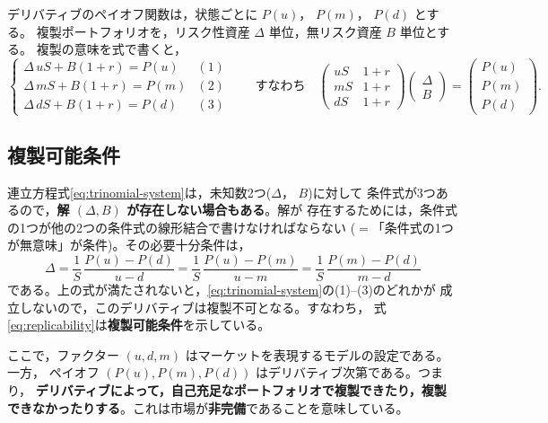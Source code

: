 デリバティブのペイオフ関数は，状態ごとに $P(u)$， $P(m)$， $P(d)$ とする。
複製ポートフォリオを，リスク性資産 $\Delta$ 単位，無リスク資産 $B$ 単位とする。
複製の意味を式で書くと，
\begin{equation}
\begin{cases}
\Delta\,uS + B(1+r) = P(u) & (1)\\
\Delta\,mS + B(1+r) = P(m) & (2)\\
\Delta\,dS + B(1+r) = P(d) & (3)
\end{cases}
\qquad\text{すなわち}\quad
\begin{pmatrix} uS & 1+r\\ mS & 1+r\\ dS & 1+r\end{pmatrix}
\begin{pmatrix}\Delta\\ B\end{pmatrix}
= \begin{pmatrix}P(u)\\ P(m)\\ P(d)\end{pmatrix}.
\label{eq:trinomial-system}
\end{equation}

\subsection{複製可能条件}

連立方程式\eqref{eq:trinomial-system}は，未知数2つ($\Delta$， $B$)に対して
条件式が3つあるので，\textbf{解 $(\Delta, B)$ が存在しない場合もある}。解が
存在するためには，条件式の1つが他の2つの条件式の線形結合で書けなければならない
($=$「条件式の1つが無意味」が条件)。その必要十分条件は，
\begin{equation}
\Delta = \frac{1}{S}\,\frac{P(u)-P(d)}{u-d}
= \frac{1}{S}\,\frac{P(u)-P(m)}{u-m}
= \frac{1}{S}\,\frac{P(m)-P(d)}{m-d}
\label{eq:replicability}
\end{equation}
である。上の式が満たされないと，\eqref{eq:trinomial-system}の(1)--(3)のどれかが
成立しないので，このデリバティブは複製不可となる。すなわち，
式\eqref{eq:replicability}は\textbf{複製可能条件}を示している。

ここで，ファクター $(u,d,m)$ はマーケットを表現するモデルの設定である。一方，
ペイオフ $(P(u), P(m), P(d))$ はデリバティブ次第である。つまり，
\textbf{デリバティブによって，自己充足なポートフォリオで複製できたり，複製
できなかったりする}。これは市場が\textbf{非完備}であることを意味している。

